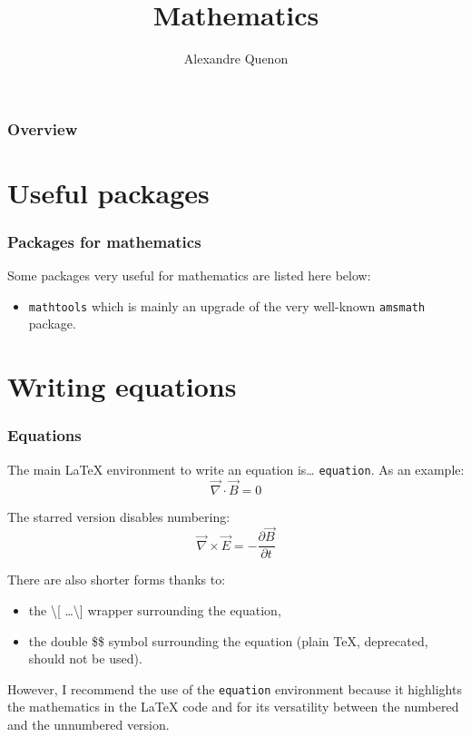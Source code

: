 \documentclass[11pt]{beamer}
\title{Mathematics}
\author[A. Quenon]{Alexandre Quenon}
\begin{document}
\begin{frame}
	\titlepage
\end{frame}


\begin{frame}
	\frametitle{Overview}
	
	\tableofcontents
\end{frame}


\section{Useful packages}

\begin{frame}
	\frametitle{Packages for mathematics}

	Some packages very useful for mathematics are listed here below:
	\begin{itemize}
		\item \texttt{mathtools} which is mainly an upgrade of the very well-known \texttt{amsmath} package.
	\end{itemize}
\end{frame}


\section{Writing equations}

\begin{frame}
	\frametitle{Equations}
	
	The main LaTeX environment to write an equation is\dots{} \texttt{equation}.
	As an example:
	\begin{equation}
		\vec{\nabla}\cdot\vec{B}=0
		\label{eq::Maxwell:no_magnetic_monopole}
	\end{equation}
	
	The starred version disables numbering:
	\begin{equation*}
		\vec{\nabla}\times\vec{E}=-\frac{\partial\vec{B}}{\partial t}
	\end{equation*}
	
	There are also shorter forms thanks to:
	\begin{itemize}
		\item the \textbackslash [ \ldots \textbackslash ] wrapper surrounding the equation,
		\item the double \$\$ symbol surrounding the equation (plain \TeX{}, deprecated, should not be used).
	\end{itemize}
	However, I recommend the use of the \texttt{equation} environment because it highlights the mathematics in the \LaTeX{} code and for its versatility between the numbered and the unnumbered version.
\end{frame}
\end{document}
